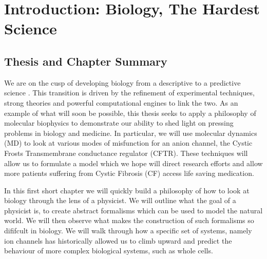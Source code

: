 \chapter{Introduction: Biology, The Hardest Science}
\setcounter{page}{1}
\label{chap:intro}
 {}
\vspace
\section{Thesis and Chapter Summary}

We are on the cusp of developing biology from a descriptive to a predictive science \cite{kochanski1973,liu2005, mogilner2016, covert2021, jumper2021}. This transition is driven by the refinement of experimental techniques, strong theories and powerful computational engines to link the two. As an example of what will soon be possible, this thesis seeks to apply a philosophy of molecular biophysics to demonstrate our ability to shed light on pressing problems in biology and medicine. In particular, we will use molecular dynamics (MD) to look at various modes of misfunction for an anion channel, the Cystic Frosts Transmembrane conductance regulator (CFTR).  These techniques will allow us to formulate a model which we hope will direct research efforts and allow more patients suffering from Cystic Fibrosis (CF) access life saving medication. 

In this first short chapter we will quickly build a philosophy of how to look at biology through the lens of a physicist. We will outline what the goal of a physicist is, to create abstract formalisms which can be used to model the natural world. We will then observe what makes the construction of such formalisms so dififcult in biology. We will walk through how a specific set of systems, namely ion channels has historically allowed us to climb upward and predict the behaviour of more complex biological systems, such as whole cells. 

